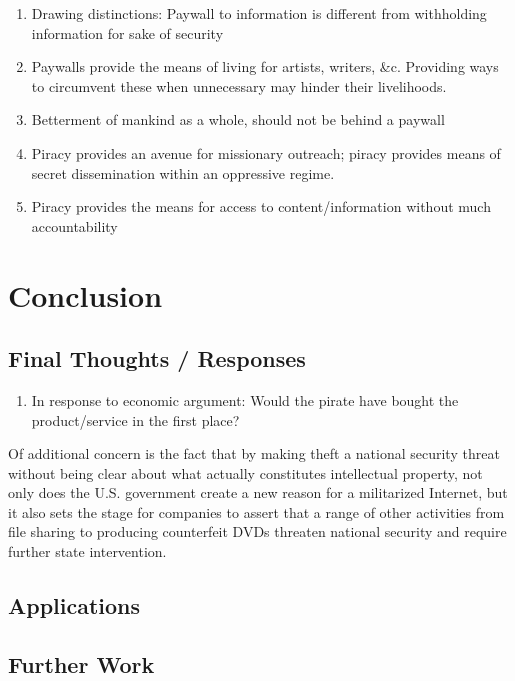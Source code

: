 \documentclass[onecolumn, 12pt]{article}
\begin{document}
\begin{enumerate}
  \item Drawing distinctions: Paywall to information is different from
    withholding information for sake of security

  \item Paywalls provide the means of living for artists, writers, \&c. Providing
    ways to circumvent these when unnecessary may hinder their livelihoods.

  \item Betterment of mankind as a whole, should not be behind a paywall

  \item Piracy provides an avenue for missionary outreach; piracy provides
    means of secret dissemination within an oppressive regime.

  \item Piracy provides the means for access to content/information without
    much accountability
\end{enumerate}

\section{Conclusion}

\subsection{Final Thoughts / Responses}

\begin{enumerate}
  \item In response to economic argument: Would the pirate have bought the
    product/service in the first place?
\end{enumerate}

\begin{displayquote}
  Of additional concern is the fact that by making 
  theft a national security threat without being clear about what actually
  constitutes intellectual property, not only does the U.S. government create a
  new reason for a militarized Internet, but it also sets the stage for companies
  to assert that a range of other activities from file sharing to producing
  counterfeit DVDs threaten national security and require further state
  intervention.~\cite[p. 264]{halbert:agendas}
\end{displayquote}


\subsection{Applications}

\subsection{Further Work}

\clearpage
\nocite{*}
\printbibliography
\end{document}
